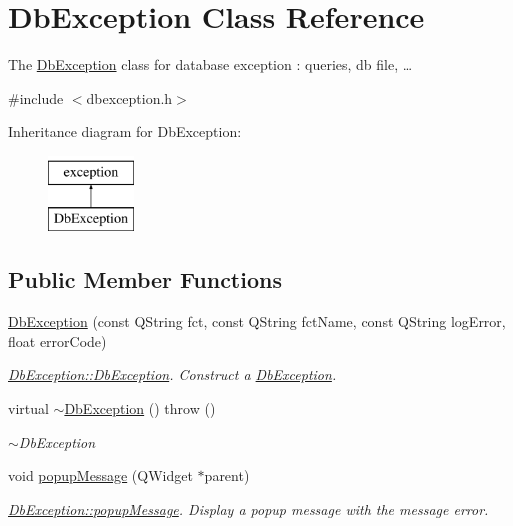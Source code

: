 \hypertarget{classDbException}{\section{Db\+Exception Class Reference}
\label{classDbException}
}


The \hyperlink{classDbException}{Db\+Exception} class for database exception \+: queries, db file, …  




{\ttfamily \#include $<$dbexception.\+h$>$}

Inheritance diagram for Db\+Exception\+:\begin{figure}[H]
\begin{center}
\leavevmode
\includegraphics[height=2.000000cm]{dd/dca/classDbException}
\end{center}
\end{figure}
\subsection*{Public Member Functions}
\begin{DoxyCompactItemize}
\item 
\hyperlink{classDbException_a22204317679895d999e3621cf97d5dee}{Db\+Exception} (const Q\+String fct, const Q\+String fct\+Name, const Q\+String log\+Error, float error\+Code)
\begin{DoxyCompactList}\small\item\em \hyperlink{classDbException_a22204317679895d999e3621cf97d5dee}{Db\+Exception\+::\+Db\+Exception}. Construct a \hyperlink{classDbException}{Db\+Exception}. \end{DoxyCompactList}\item 
\hypertarget{classDbException_a57b57d4d9010c06d158ccc44d45a1376}{virtual \hyperlink{classDbException_a57b57d4d9010c06d158ccc44d45a1376}{$\sim$\+Db\+Exception} ()  throw ()}\label{classDbException_a57b57d4d9010c06d158ccc44d45a1376}

\begin{DoxyCompactList}\small\item\em $\sim$\+Db\+Exception \end{DoxyCompactList}\item 
void \hyperlink{classDbException_a06765391cd11f596721c877c1a62c2f1}{popup\+Message} (Q\+Widget $\ast$parent)
\begin{DoxyCompactList}\small\item\em \hyperlink{classDbException_a06765391cd11f596721c877c1a62c2f1}{Db\+Exception\+::popup\+Message}. Display a popup message with the message error. \end{DoxyCompactList}\end{DoxyCompactItemize}


